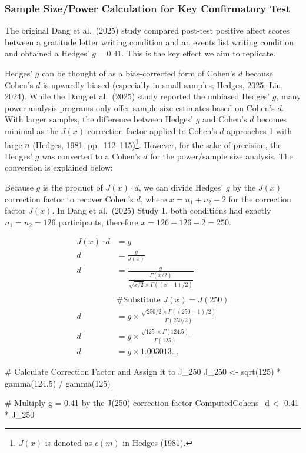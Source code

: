 \documentclass[
  letterpaper,
  DIV=11,
  numbers=noendperiod]{scrartcl}
\newenvironment{Shaded}{\begin{snugshade}}{\end{snugshade}}
\newcommand{\CommentTok}[1]{\textcolor[rgb]{0.37,0.37,0.37}{#1}}
\newcommand{\DecValTok}[1]{\textcolor[rgb]{0.68,0.00,0.00}{#1}}
\newcommand{\FloatTok}[1]{\textcolor[rgb]{0.68,0.00,0.00}{#1}}
\newcommand{\FunctionTok}[1]{\textcolor[rgb]{0.28,0.35,0.67}{#1}}
\newcommand{\NormalTok}[1]{\textcolor[rgb]{0.00,0.23,0.31}{#1}}
\newcommand{\OtherTok}[1]{\textcolor[rgb]{0.00,0.23,0.31}{#1}}
\newcommand{\SpecialCharTok}[1]{\textcolor[rgb]{0.37,0.37,0.37}{#1}}
\begin{document}
\subsubsection{Sample Size/Power Calculation for Key Confirmatory
Test}\label{sample-sizepower-calculation-for-key-confirmatory-test}

The original Dang et al.~(2025) study compared post-test positive affect
scores between a gratitude letter writing condition and an events list
writing condition and obtained a Hedges' \(g = 0.41\). This is the key
effect we aim to replicate.

Hedges' \(g\) can be thought of as a bias-corrected form of Cohen's
\(d\) because Cohen's \(d\) is upwardly biased (especially in small
samples; Hedges, 2025; Liu, 2024). While the Dang et al.~(2025) study
reported the unbiased Hedges' \(g\), many power analysis programs only
offer sample size estimates based on Cohen's \(d\). With larger samples,
the difference between Hedges' \(g\) and Cohen's \(d\) becomes minimal
as the \(J(x)\) correction factor applied to Cohen's \(d\) approaches 1
with large \(n\) (Hedges, 1981, pp.~112--115)\footnote{\(J(x)\) is
  denoted as \(c(m)\) in Hedges (1981).}. However, for the sake of
precision, the Hedges' \(g\) was converted to a Cohen's \(d\) for the
power/sample size analysis. The conversion is explained below:

Because \(g\) is the product of \(J(x)\cdot d\), we can divide Hedges'
\(g\) by the \(J(x)\) correction factor to recover Cohen's \(d\), where
\(x=n_1+n_2-2\) for the correction factor \(J(x)\). In Dang et
al.~(2025) Study 1, both conditions had exactly \(n_1=n_2=126\)
participants, therefore \(x = 126+126-2=250\).

\[
\begin{aligned}
J(x) \cdot d &=g \\
d &= \frac{g}{J(x)}\\d & = \frac{g}{\dfrac{\Gamma(x/2)}{\sqrt{x/2}\times\Gamma((x-1)/2)}}\\\\
&\# \text{Substitute $J(x) = J(250)$}\\
d&=g\times 
\frac{\sqrt{250/2}\times \Gamma((250-1)/2)}{\Gamma(250/2)}\\d&=g\times \frac{\sqrt{125}\times \Gamma(124.5)}{\Gamma(125)}\\d&=g\times 1.003013...
\end{aligned}
\]

\begin{Shaded}
\begin{Highlighting}[]
\CommentTok{\# Calculate Correction Factor and Assign it to J\_250}
\NormalTok{J\_250 }\OtherTok{\textless{}{-}} \FunctionTok{sqrt}\NormalTok{(}\DecValTok{125}\NormalTok{) }\SpecialCharTok{*} \FunctionTok{gamma}\NormalTok{(}\FloatTok{124.5}\NormalTok{) }\SpecialCharTok{/} \FunctionTok{gamma}\NormalTok{(}\DecValTok{125}\NormalTok{)}

\CommentTok{\# Multiply g = 0.41 by the J(250) correction factor}
\NormalTok{ComputedCohens\_d }\OtherTok{\textless{}{-}} \FloatTok{0.41} \SpecialCharTok{*}\NormalTok{ J\_250}
\end{Highlighting}
\end{Shaded}
\end{document}
